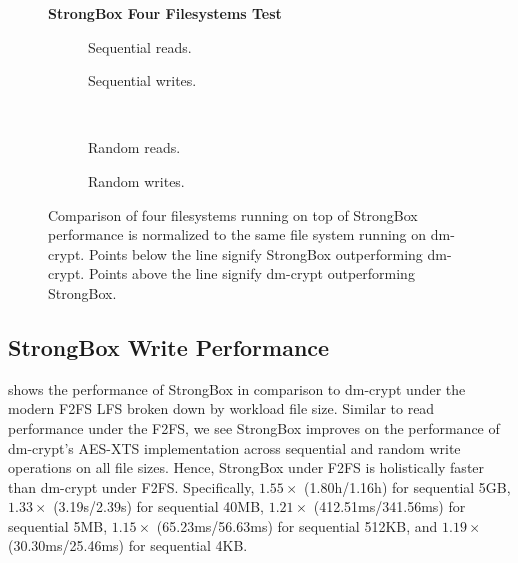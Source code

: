 \begin{figure}[ht]
    \textbf{StrongBox Four Filesystems Test}\par\medskip
    \centering
    \begin{subfigure}{0.5\linewidth}
        \centering
        {}
        \caption{Sequential reads.}
       \label{fig:microbench-gamut-sequential-r}
    \end{subfigure}\hspace*{0.5em}%
    \begin{subfigure}{0.5\linewidth}
        \centering
        {}
        \caption{Sequential writes.}
       \label{fig:microbench-gamut-sequential-w}
    \end{subfigure}\\[1ex]
    \hspace*{-0.9em}%
    \begin{subfigure}{0.5\linewidth}
        \vspace{0.5em}
        \centering
        {}
        \caption{Random reads.}
       \label{fig:microbench-gamut-random-r}
    \end{subfigure}%
    \begin{subfigure}{0.5\linewidth}
        \centering
        {}
        \caption{Random writes.}
       \label{fig:microbench-gamut-random-w}
    \end{subfigure}
    \caption{Comparison of four filesystems running on top of
      StrongBox performance is normalized to the same file system
      running on dm-crypt. Points below the line signify StrongBox
      outperforming dm-crypt. Points above the line signify dm-crypt
      outperforming StrongBox.}
   \label{fig:microbench-gamut}
\end{figure}

\subsection{StrongBox Write Performance}

 shows the performance of StrongBox in comparison to
dm-crypt under the modern F2FS LFS broken down by workload file size. Similar to
read performance under the F2FS, we see StrongBox improves on the performance of
dm-crypt's AES-XTS implementation across sequential and random write operations
on all file sizes. Hence, StrongBox under F2FS is holistically faster than
dm-crypt under F2FS\@. Specifically, $1.55\times$ (1.80h/1.16h) for sequential
5GB, $1.33\times$ (3.19s/2.39s) for sequential 40MB, $1.21\times$
(412.51ms/341.56ms) for sequential 5MB, $1.15\times$ (65.23ms/56.63ms) for
sequential 512KB, and $1.19\times$ (30.30ms/25.46ms) for sequential 4KB\@.

